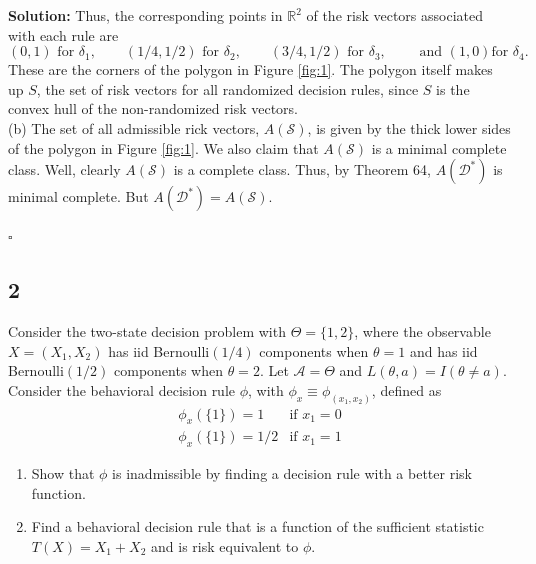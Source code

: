 \documentclass[12pt]{article}
\newcounter{ProofCounter}
\newenvironment{Solution}{\stepcounter{ProofCounter}\textbf{Solution:}}{\hfill$\square$}
\begin{document}
\begin{Solution}
  Thus, the corresponding points in $\mathbb{R}^2$ of the risk vectors associated with each rule are 
  \[
    (0,1) \text{ for } \delta_1, \qquad (1/4, 1/2) \text{ for } \delta_2, \qquad (3/4, 1/2) \text{ for } \delta_3, \qquad \text{ and } (1, 0) \text{
    for } \delta_4.
  \]
  These are the corners of the polygon in Figure \ref{fig:1}. The polygon itself makes up $S$, the set of risk vectors for all randomized decision
  rules, since $S$ is the convex hull of the non-randomized risk vectors. \\

  (b) The set of all admissible rick vectors, $A(\mathcal{S})$, is given by the thick lower sides of the polygon in Figure \ref{fig:1}. We also claim that
  $A(\mathcal{S})$ is a minimal complete class. Well, clearly $A(\mathcal{S})$ is a complete class. Thus, by Theorem 64, $A(\mathcal{D}^{*})$ is
  minimal complete. But $A(\mathcal{D}^*) = A(\mathcal{S})$.

\end{Solution}

\newpage

\subsection*{2}
\begin{tcolorbox}
Consider the two-state decision problem with $\Theta=\{1,2\}$, where the observable $X=(X_1,X_2)$ has iid Bernoulli$(1/4)$
  components when $\theta=1$ and  has iid Bernoulli$(1/2)$
  components when $\theta=2$. Let $\mathcal{A}=\Theta$ and $L(\theta,a)=I(\theta \neq a)$.  Consider the behavioral decision rule $\phi$, with $\phi_x\equiv \phi_{(x_1,x_2)}$, defined as
  \begin{eqnarray*}
    \phi_x(\{1\})=1 &\mbox{if $x_1=0$}\\
    \phi_x(\{1\})=1/2 &\mbox{if $x_1=1$}
  \end{eqnarray*}

  \begin{enumerate}
    \item Show that $\phi$ is inadmissible by finding a decision rule with a better risk function.

    \item Find a behavioral decision rule that is a function of the sufficient statistic $T(X)=X_1+X_2$ and is risk equivalent to $\phi$.

  \end{enumerate}
\end{tcolorbox}
\end{document}
